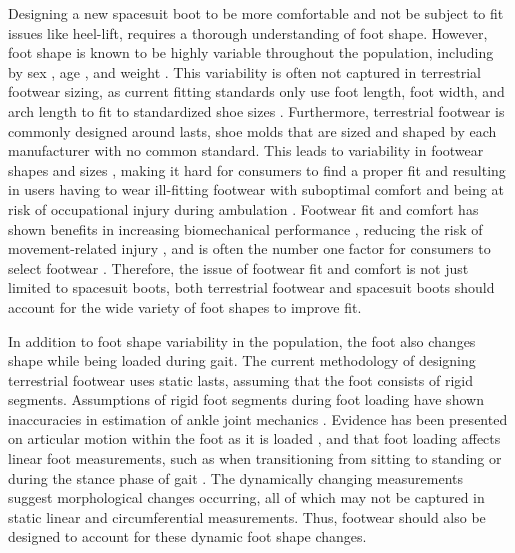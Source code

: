 \documentclass[defaultstyle,11pt]{comps}
\begin{document}
Designing a new spacesuit boot to be more comfortable and not be subject to fit issues like heel-lift, requires a thorough understanding of foot shape.
However, foot shape is known to be highly variable throughout the population, including by sex \citep{Wunderlich2001, Krauss2008, Krauss2010}, age \citep{Tomassoni2014}, and weight \citep{Price2016}.
This variability is often not captured in terrestrial footwear sizing, as current fitting standards only use foot length, foot width, and arch length to fit to standardized shoe sizes \citep{ASTM2017}.
Furthermore, terrestrial footwear is commonly designed around lasts, shoe molds that are sized and shaped by each manufacturer with no common standard.
This leads to variability in footwear shapes and sizes \citep{Jurca2013, Wannop2019}, making it hard for consumers to find a proper fit and resulting in users having to wear ill-fitting footwear with suboptimal comfort and being at risk of occupational injury during ambulation \citep{Dobson2018b}.
Footwear fit and comfort has shown benefits in increasing biomechanical performance \citep{Pryhoda2021}, reducing the risk of movement-related injury \citep{Mundermann2001a}, and is often the number one factor for consumers to select footwear \citep{Martinez-Martinez2017}.
Therefore, the issue of footwear fit and comfort is not just limited to spacesuit boots, both terrestrial footwear and spacesuit boots should account for the wide variety of foot shapes to improve fit.

In addition to foot shape variability in the population, the foot also changes shape while being loaded during gait.
The current methodology of designing terrestrial footwear uses static lasts, assuming that the foot consists of rigid segments.
Assumptions of rigid foot segments during foot loading have shown inaccuracies in estimation of ankle joint mechanics \citep{Zelik2018, Kessler2020}.
Evidence has been presented on articular motion within the foot as it is loaded \citep{Lundgren2008, Wolf2008}, and that foot loading affects linear foot measurements, such as when transitioning from sitting to standing \citep{Xiong2009, Oladipo2008} or during the stance phase of gait \citep{Kouchi2009, Barisch-Fritz2014, Grau2018}.
The dynamically changing measurements suggest morphological changes occurring, all of which may not be captured in static linear and circumferential measurements.
Thus, footwear should also be designed to account for these dynamic foot shape changes.
\end{document}
